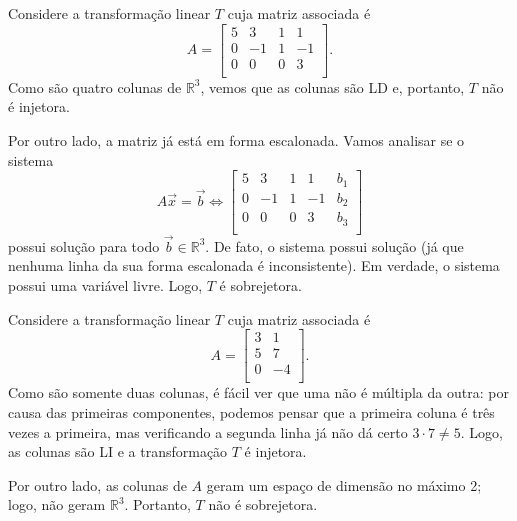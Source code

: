 \begin{ex}\label{exp:injsob1}
Considere a transformação linear $T$ cuja matriz associada é
\begin{equation}
A = \left[
  \begin{array}{rrrr}
    5  & 3 & 1 & 1 \\
    0  & -1 & 1 & -1 \\
    0  & 0 & 0 & 3 \\
  \end{array}
\right].
\end{equation} Como são quatro colunas de $\mathbb{R}^3$, vemos que as colunas são LD e, portanto, $T$ não é injetora.

Por outro lado, a matriz já está em forma escalonada. Vamos analisar se o sistema
\begin{equation}
A \vec{x} = \vec{b} \iff
\left[
  \begin{array}{rrrr|r}
    5  & 3 & 1 & 1 & b_1\\
    0  & -1 & 1 & -1& b_2\\
    0  & 0 & 0 & 3& b_3\\
  \end{array}
\right]
\end{equation} possui solução para todo $\vec{b} \in \mathbb{R}^3$. De fato, o sistema possui solução (já que nenhuma linha da sua forma escalonada é inconsistente). Em verdade, o sistema possui uma variável livre. Logo, $T$ é sobrejetora.
\end{ex}


\begin{ex}\label{exp:injsob2}
Considere a transformação linear $T$ cuja matriz associada é
\begin{equation}
A = \left[
  \begin{array}{rrrr}
    3  & 1 \\
    5  & 7 \\
    0  & -4 \\
  \end{array}
\right].
\end{equation} Como são somente duas colunas, é fácil ver que uma não é múltipla da outra: por causa das primeiras componentes, podemos pensar que a primeira coluna é três vezes a primeira, mas verificando a segunda linha já não dá certo $3\cdot 7 \neq 5$. Logo, as colunas são LI e a transformação $T$ é injetora.

Por outro lado,  as colunas de $A$ geram um espaço de dimensão no máximo 2; logo, não geram $\mathbb{R}^3$. Portanto, $T$ não é sobrejetora.
\end{ex}


